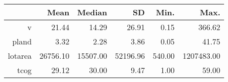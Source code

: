 \begin{table}[ht]
\centering
\begin{tabular}{rrrrrr}
  \hline
 & Mean & Median & SD & Min. & Max. \\ 
  \hline
v & 21.44 & 14.29 & 26.91 & 0.15 & 366.62 \\ 
  pland & 3.32 & 2.28 & 3.86 & 0.05 & 41.75 \\ 
  lotarea & 26756.10 & 15507.00 & 52196.96 & 540.00 & 1207483.00 \\ 
  tcog & 29.12 & 30.00 & 9.47 & 1.00 & 59.00 \\ 
   \hline
\end{tabular}
\end{table}
